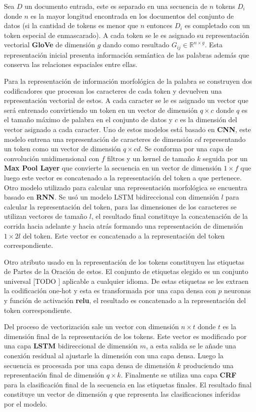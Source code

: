 Sea $D$ un documento entrada, este es separado en una secuencia de $n$ tokens $D_i$ donde $n$ es la mayor longitud encontrada
en los documentos del conjunto de datos (si la cantidad de tokens es menor que $n$ entonces $D_i$ es completado con un token especial de enmascarado). 
A cada token se le es asignado
su representación vectorial \textbf{GloVe} de dimensión $g$ dando como resultado $G_{ij} \in \mathbb{R}^{n \times g}$.
Esta representación inicial presenta información semántica de las palabras además que conserva las relaciones 
espaciales entre ellas. 

Para la representación de información morfológica de la palabra se construyen dos
codificadores que procesan los caracteres de cada token y devuelven una representación vectorial de estos.
A cada caracter se le es asignado un vector que será entrenado convirtiendo un token en un vector de dimensión
$q \times c$ donde $q$ es el tamaño máximo de palabra en el conjunto de datos y $c$ es la dimensión del vector
asignado a cada caracter.
Uno de estos modelos está basado en \textbf{CNN}, este modelo entrena una representación de caracteres de dimensión
$cd$ representando un token como un vector de dimensión $q \times cd$. Se conforma por una capa de convolución unidimensional
con $f$ filtros y un kernel de tamaño $k$ seguida por un \textbf{Max Pool Layer} que convierte la secuencia en un vector
de dimensión $1 \times f$ que luego este vector es concatenado a la representación del token a que pertenece.
Otro modelo utilizado para calcular una representación morfológica se encuentra basado en \textbf{RNN}. Se usó
un modelo LSTM bidireccional con dimensión $l$ para calcular la representación del token, para las dimensiones de los caracteres se
utilizan vectores de tamaño $l$, el resultado final constituye la concatenación de la corrida hacia adelante y
hacia atrás formando una representación de dimensión $1 \times 2l$ del token. Este vector es concatenado a la representación
del token correspondiente.

Otro atributo usado en la representación de los tokens constituyen las etiquetas de Partes de la Oración de estos.
El conjunto de etiquetas elegido es un conjunto universal [TODO \cite{Referencia a la def}] aplicable a cualquier idioma.
De estas etiquetas se les extraen la codificación one-hot y esta es transformada por una capa densa con $p$ neuronas
y función de activación \textbf{relu}, el resultado es concatenado a la representación del token correspondiente.

Del proceso de vectorización sale un vector con dimensión $n \times t$ donde $t$ es la dimensión final de la representación
de los tokens. Este vector es modificado por una capa \textbf{LSTM} bidireccional de dimensión $m$, a esta salida se le 
añade una conexión residual al ajustarle la dimensión con una capa densa. Luego la secuencia es procesada por una 
capa densa de dimensión $k$ produciendo una representación final de dimensión $q \times k$.
Finalmente se utiliza una capa \textbf{CRF}
para la clasificación final de la secuencia en las etiquetas finales. El resultado final constituye un vector
de dimensión $q$ que representa las clasificaciones inferidas por el modelo.

